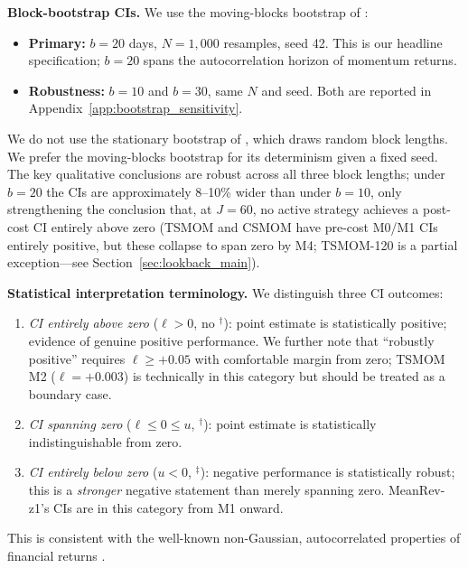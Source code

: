 \documentclass[12pt]{article}
\begin{document}
\textbf{Block-bootstrap CIs.} We use the moving-blocks bootstrap of
\citet{kunsch1989jackknife}:

\begin{itemize}[nosep]
  \item \textbf{Primary:} $b = 20$ days, $N = 1{,}000$ resamples,
    seed 42. This is our headline specification; $b = 20$ spans
    the autocorrelation horizon of momentum returns.
  \item \textbf{Robustness:} $b = 10$ and $b = 30$, same $N$ and seed.
    Both are reported in Appendix~\ref{app:bootstrap_sensitivity}.
\end{itemize}

We do not use the stationary bootstrap of \citet{politis1994stationary},
which draws random block lengths. We prefer the moving-blocks bootstrap
for its determinism given a fixed seed. The key qualitative conclusions
are robust across all three block lengths; under $b = 20$ the CIs are
approximately 8--10\% wider than under $b = 10$, only strengthening
the conclusion that, at $J=60$, no active strategy achieves a
post-cost CI entirely above zero (TSMOM and CSMOM have pre-cost M0/M1
CIs entirely positive, but these collapse to span zero by M4;
TSMOM-120 is a partial exception---see
Section~\ref{sec:lookback_main}).

\textbf{Statistical interpretation terminology.}
We distinguish three CI outcomes:
\begin{enumerate}[nosep, label=(\roman*)]
  \item \textit{CI entirely above zero} ($\ell > 0$, no $^\dagger$):
    point estimate is statistically positive; evidence of genuine
    positive performance. We further note that ``robustly positive''
    requires $\ell \ge +0.05$ with comfortable margin from zero;
    TSMOM M2 ($\ell = +0.003$) is technically in this category but
    should be treated as a boundary case.
  \item \textit{CI spanning zero} ($\ell \le 0 \le u$, $^\dagger$):
    point estimate is statistically indistinguishable from zero.
  \item \textit{CI entirely below zero} ($u < 0$, $^\ddagger$):
    negative performance is statistically robust; this is a
    \emph{stronger} negative statement than merely spanning zero.
    MeanRev-z1's CIs are in this category from M1 onward.
\end{enumerate}
This is consistent with the well-known non-Gaussian, autocorrelated
properties of financial returns \citep{cont2001empirical}.
\end{document}
